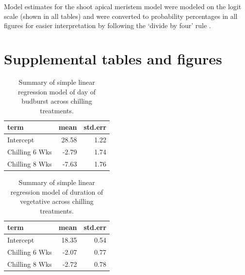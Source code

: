 \documentclass{article}\usepackage[]{graphicx}\usepackage[]{color}
\begin{document}
Model estimates for the shoot apical meristem model were modeled on the logit scale (shown in all tables) and were converted to probability percentages in all figures for easier interpretation by following the `divide by four' rule \citep{Gelman2006}.



\section*{Supplemental tables and figures}

\begin{table}[H]
\centering
\caption{Summary of simple linear regression model of day of budburst across chilling treatments.} 
\label{tab:simpbb}
\begin{tabular}{lrr}
  \hline
term & mean & std.err \\ 
  \hline
Intercept & 28.58 & 1.22 \\ 
  Chilling 6 Wks & -2.79 & 1.74 \\ 
  Chilling 8 Wks & -7.63 & 1.76 \\ 
   \hline
\end{tabular}
\end{table}
\begin{table}[H]
\centering
\caption{Summary of simple linear regression model of duration of vegetative across chilling treatments.} 
\label{tab:simpdvr}
\begin{tabular}{lrr}
  \hline
term & mean & std.err \\ 
  \hline
Intercept & 18.35 & 0.54 \\ 
  Chilling 6 Wks & -2.07 & 0.77 \\ 
  Chilling 8 Wks & -2.72 & 0.78 \\ 
   \hline
\end{tabular}
\end{table}
\end{document}
